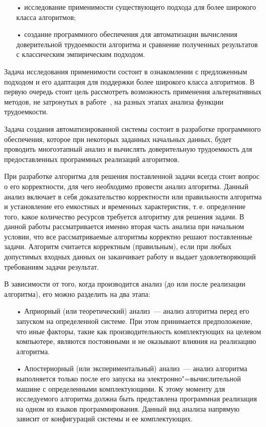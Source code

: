 \documentclass[a4paper, article, 14pt]{extarticle}
\begin{document}
\begin{enumerate}
	\item[•] исследование применимости существующего подхода для более широкого класса алгоритмов;

	\item[•] создание программного обеспечения для автоматизации вычисления доверительной трудоемкости алгоритма и сравнение полученных результатов с классическим эмпирическим подходом.
\end{enumerate}

Задача исследования применимости состоит в ознакомлении с предложенным подходом и его адаптация для поддержки более широкого класса алгоритмов. В первую очередь стоит цель рассмотреть возможность применения альтернативных методов, не затронутых в работе~\cite{petrushyn_ulyanov_analysis}, на разных этапах анализа функции трудоемкости.

Задача создания автоматизированной системы состоит в разработке программного обеспечения, которое при некоторых заданных начальных данных, будет проводить многоэтапный анализ и вычислять доверительную трудоемкость для предоставленных программных реализаций алгоритмов.

\label{sec:literature_review}

При разработке алгоритма для решения поставленной задачи всегда стоит вопрос о его корректности, для чего необходимо провести анализ алгоритма. Данный анализ включает в себя доказательство корректности или правильности алгоритма и установление его емкостных и временных характеристик, т.\,е. определение того, какое количество ресурсов требуется алгоритму для решения задачи. В данной работы рассматривается именно вторая часть анализа при начальном условии, что все рассматриваемые алгоритмы корректно решают поставленные задачи. Алгоритм считается корректным (правильным), если при любых допустимых входных данных он заканчивает работу и выдает удовлетворяющий требованиям задачи результат.

В зависимости от того, когда производится анализ (до или после реализации алгоритма), его можно разделить на два этапа:

\begin{enumerate}
	\item[•] Априорный (или теоретический) анализ~--- анализ алгоритма перед его запуском на определенной системе. При этом принимается предположение, что иные факторы, такие как производительность комплектующих на целевом компьютере, являются постоянными и не оказывают влияния на реализацию алгоритма.

	\item[•] Апостериорный (или экспериментальный) анализ~--- анализ алгоритма выполняется только после его запуска на электронно"=вычислительной машине с определенными комплектующими. К этому моменту для исследуемого алгоритма должна быть представлена программная реализация на одном из языков программирования. Данный вид анализа напрямую зависит от конфигураций системы и ее комплектующих.
\end{enumerate}
\end{document}
